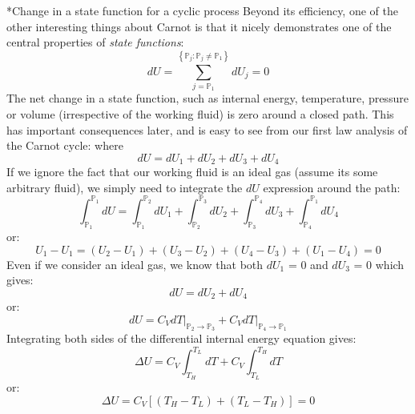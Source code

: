 \documentclass[11pt]{article}
\makeatletter
\theoremstyle{definition}
\renewcommand\subsubsection{\@startsection
	{subsubsection}{2}{0mm}
	{-0.05in}
	{-0.5\baselineskip}
	{\normalfont\normalsize\bfseries}}
\makeatother
\begin{document}
\subsubsection*{Change in a state function for a cyclic process}
Beyond its efficiency, one of the other interesting things about Carnot is that it nicely demonstrates one of the central properties of \textit{state functions}:
\begin{equation}
dU = \sum_{j=\mathbb{P}_{1}}^{\left\{\mathbb{P}_{j}:\mathbb{P}_{j}\neq\mathbb{P}_{1}\right\}}dU_j = 0
\end{equation}The net change in a state function, such as internal energy, temperature, pressure or volume (irrespective of the working fluid) is zero around a closed path.
This has important consequences later, and is easy to see from our first law analysis of the Carnot cycle: where
\begin{equation}
dU = dU_{1}+dU_{2}+dU_{3}+dU_{4}
\end{equation}If we ignore the fact that our working fluid is an ideal gas (assume its some arbitrary fluid), we simply need to integrate the $dU$ expression around the
path:
\begin{equation}
\int_{\mathbb{P}_{1}}^{\mathbb{P}_{1}}dU = \int_{\mathbb{P}_{1}}^{\mathbb{P}_{2}}dU_{1}+\int_{\mathbb{P}_{2}}^{\mathbb{P}_{3}}dU_{2}+\int_{\mathbb{P}_{3}}^{\mathbb{P}_{4}}dU_{3}+\int_{\mathbb{P}_{4}}^{\mathbb{P}_{1}}dU_{4}
\end{equation}or:
\begin{equation}
U_{1} - U_{1} = \left(U_{2} - U_{1}\right) + \left(U_{3} - U_{2}\right) + \left(U_{4} - U_{3}\right) + \left(U_{1} - U_{4}\right) = 0
\end{equation}Even if we consider an ideal gas, we know that both $dU_{1}$ = 0 and $dU_{3}$ = 0 which gives:
\begin{equation}
dU  = dU_{2} + dU_{4}
\end{equation}or:
\begin{equation}
dU = C_{V}dT\Bigr|_{\mathbb{P}_{2}\rightarrow\mathbb{P}_{3}}+C_{V}dT\Bigr|_{\mathbb{P}_{4}\rightarrow\mathbb{P}_{1}}
\end{equation}Integrating both sides of the differential internal energy equation gives:
\begin{equation}
\Delta{U} = C_{V}\int_{T_{H}}^{T_{L}}dT+C_{V}\int_{T_{L}}^{T_{H}}dT
\end{equation}or:
\begin{equation}
\Delta{U} = C_{V}\left[\left(T_{H} - T_{L}\right)+\left(T_{L} - T_{H}\right)\right] = 0
\end{equation}
\end{document}
